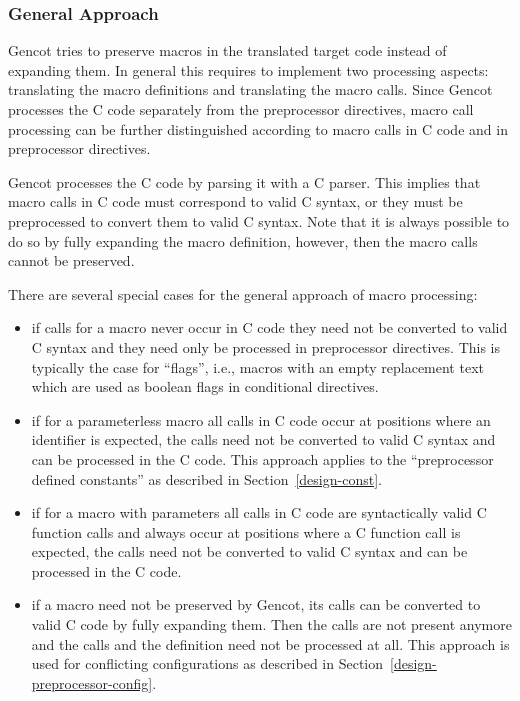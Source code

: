 \subsubsection{General Approach}

Gencot tries to preserve macros in the translated target code instead of expanding them. In general this requires
to implement two processing aspects: translating the macro definitions and translating the macro calls. Since Gencot
processes the C code separately from the preprocessor directives, macro call processing can be further distinguished
according to macro calls in C code and in preprocessor directives.

Gencot processes the C code by parsing it with a C parser. This implies that macro calls in C code must correspond
to valid C syntax, or they must be preprocessed to convert them to valid C syntax. Note that it is always possible
to do so by fully expanding the macro definition, however, then the macro calls cannot be preserved.

There are several special cases for the general approach of macro processing:
\begin{itemize}
\item if calls for a macro never occur in C code they need not be converted to valid C syntax and they need
only be processed in preprocessor directives. This is typically the case for ``flags'', i.e., macros with
an empty replacement text which are used as boolean flags in conditional directives.
\item if for a parameterless macro all calls in C code occur at positions where an identifier is expected,
the calls need not be converted to valid C syntax and can be processed in the C code. This approach applies
to the ``preprocessor defined constants'' as described in Section~\ref{design-const}. 
\item if for a macro with parameters all calls in C code are syntactically valid C function calls and
always occur at positions where a C function call is expected, the calls need not be converted to valid C 
syntax and can be processed in the C code.
\item if a macro need not be preserved by Gencot, its calls can be converted to valid C code by fully expanding
them. Then the calls are not present anymore and the calls and the definition need not be processed at all.
This approach is used for conflicting configurations as described in Section~\ref{design-preprocessor-config}.
\end{itemize}

